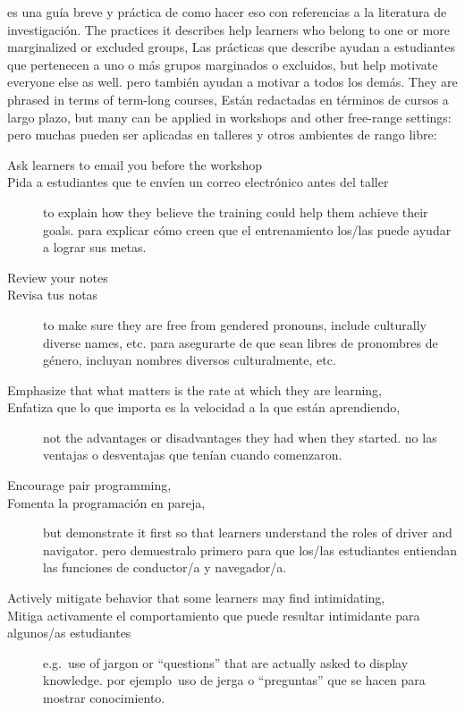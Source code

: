 \cite{Lee2017} es una guía breve y práctica de como hacer eso con referencias a la literatura de investigación.
The practices it describes help learners who belong to one or more marginalized or excluded groups,
Las prácticas que describe ayudan a estudiantes que pertenecen a uno o más grupos marginados o excluidos,
but help motivate everyone else as well.
pero también ayudan a motivar a todos los demás.
They are phrased in terms of term-long courses,
Están redactadas en términos de cursos a largo plazo,
but many can be applied in workshops and other free-range settings:
pero muchas pueden ser aplicadas en talleres y otros ambientes de rango libre:

\begin{description}

\item[Ask learners to email you before the workshop]
\item[Pida a estudiantes que te envíen un correo electrónico antes del taller]
  to explain how they believe the training could help them achieve their goals.
  para explicar cómo creen que el entrenamiento los/las puede ayudar a lograr sus metas.

\item[Review your notes]
\item[Revisa tus notas]
  to make sure they are free from gendered pronouns, include culturally diverse names, etc.
  para asegurarte de que sean libres de pronombres de género, incluyan nombres diversos culturalmente, etc.

\item[Emphasize that what matters is the rate at which they are learning,]
\item[Enfatiza que lo que importa es la velocidad a la que están aprendiendo,]
  not the advantages or disadvantages they had when they started.
  no las ventajas o desventajas que tenían cuando comenzaron.

\item[Encourage pair programming,]
\item[Fomenta la programación en pareja,]
  but demonstrate it first so that learners understand the roles of driver and navigator.
  pero demuestralo primero para que los/las estudiantes entiendan las funciones de conductor/a y navegador/a.

\item[Actively mitigate behavior that some learners may find intimidating,]
\item[Mitiga activamente el comportamiento que puede resultar intimidante para algunos/as estudiantes]
  e.g.\ use of jargon or ``questions'' that are actually asked to display knowledge.
  por ejemplo\ uso de jerga o ``preguntas'' que se hacen para mostrar conocimiento.

\end{description}

